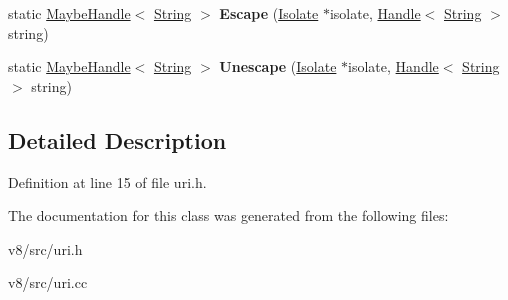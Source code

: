 \begin{DoxyCompactItemize}
\mbox{\label{classv8_1_1internal_1_1Uri_a4434ac06f00dc2ee80b4997c7c7b557a}} 
static \mbox{\hyperlink{classv8_1_1internal_1_1MaybeHandle}{Maybe\+Handle}}$<$ \mbox{\hyperlink{classv8_1_1internal_1_1String}{String}} $>$ {\bfseries Escape} (\mbox{\hyperlink{classv8_1_1internal_1_1Isolate}{Isolate}} $\ast$isolate, \mbox{\hyperlink{classv8_1_1internal_1_1Handle}{Handle}}$<$ \mbox{\hyperlink{classv8_1_1internal_1_1String}{String}} $>$ string)
\item 
\mbox{\label{classv8_1_1internal_1_1Uri_a287eaa4a576f493c415d5e6606ff2e47}} 
static \mbox{\hyperlink{classv8_1_1internal_1_1MaybeHandle}{Maybe\+Handle}}$<$ \mbox{\hyperlink{classv8_1_1internal_1_1String}{String}} $>$ {\bfseries Unescape} (\mbox{\hyperlink{classv8_1_1internal_1_1Isolate}{Isolate}} $\ast$isolate, \mbox{\hyperlink{classv8_1_1internal_1_1Handle}{Handle}}$<$ \mbox{\hyperlink{classv8_1_1internal_1_1String}{String}} $>$ string)
\end{DoxyCompactItemize}


\subsection{Detailed Description}


Definition at line 15 of file uri.\+h.



The documentation for this class was generated from the following files\+:\begin{DoxyCompactItemize}
\item 
v8/src/uri.\+h\item 
v8/src/uri.\+cc\end{DoxyCompactItemize}
